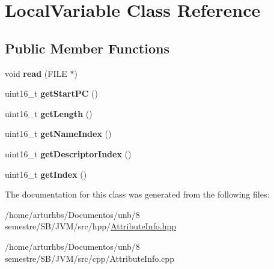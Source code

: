 \hypertarget{classLocalVariable}{}\section{Local\+Variable Class Reference}
\label{classLocalVariable}
\subsection*{Public Member Functions}
\begin{DoxyCompactItemize}
\item 
void {\bfseries read} (F\+I\+LE $\ast$)\hypertarget{classLocalVariable_a3cef8432f0a18abb1f809112b14bda18}{}\label{classLocalVariable_a3cef8432f0a18abb1f809112b14bda18}

\item 
uint16\+\_\+t {\bfseries get\+Start\+PC} ()\hypertarget{classLocalVariable_a3ed983dbf92a7b56a4096eb928ab6969}{}\label{classLocalVariable_a3ed983dbf92a7b56a4096eb928ab6969}

\item 
uint16\+\_\+t {\bfseries get\+Length} ()\hypertarget{classLocalVariable_a9523495de1a150cd40807915f26350f7}{}\label{classLocalVariable_a9523495de1a150cd40807915f26350f7}

\item 
uint16\+\_\+t {\bfseries get\+Name\+Index} ()\hypertarget{classLocalVariable_a4e18764c127c71b468d8293d82eb8829}{}\label{classLocalVariable_a4e18764c127c71b468d8293d82eb8829}

\item 
uint16\+\_\+t {\bfseries get\+Descriptor\+Index} ()\hypertarget{classLocalVariable_a93edc1eea8e9e8707bc6695468e60f41}{}\label{classLocalVariable_a93edc1eea8e9e8707bc6695468e60f41}

\item 
uint16\+\_\+t {\bfseries get\+Index} ()\hypertarget{classLocalVariable_a7ca64976e76d4ac0e42436f713cc48f6}{}\label{classLocalVariable_a7ca64976e76d4ac0e42436f713cc48f6}

\end{DoxyCompactItemize}


The documentation for this class was generated from the following files\+:\begin{DoxyCompactItemize}
\item 
/home/arturhbs/\+Documentos/unb/8 semestre/\+S\+B/\+J\+V\+M/src/hpp/\hyperlink{AttributeInfo_8hpp}{Attribute\+Info.\+hpp}\item 
/home/arturhbs/\+Documentos/unb/8 semestre/\+S\+B/\+J\+V\+M/src/cpp/Attribute\+Info.\+cpp\end{DoxyCompactItemize}
